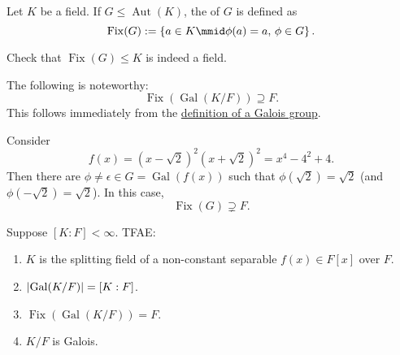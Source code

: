 \documentclass[notoc,notitlepage,nobib]{tufte-book}
\DeclareMathOperator{\Aut}{Aut}
\DeclareMathOperator{\Gal}{Gal}
\DeclareMathOperator{\Fix}{Fix}
\begin{document}
\begin{defn}\label{defn:fixed_field}
  Let $K$ be a field. If $G \leq \Aut(K)$, the  of $G$ is
  defined as
  \begin{equation*}
    \Fix(G) := \left\{ a \in K \mmid \phi(a) = a, \, \phi \in G \right\}.
  \end{equation*}
\end{defn}

\begin{ex}
  Check that $\Fix(G) \leq K$ is indeed a field.
\end{ex}

\begin{remark}
  The following is noteworthy:
  \begin{equation*}
    \Fix(\Gal(K / F)) \supseteq F.
  \end{equation*}
  This follows immediately from the \hyperref[defn:galois_group]{definition of a
  Galois group}.
\end{remark}

\begin{eg}
  Consider
  \begin{equation*}
    f(x) = (x - \sqrt{2})^2 (x + \sqrt{2})^2 = x^4 - 4^2 + 4.
  \end{equation*}
  Then there are $\phi \neq \epsilon \in G = \Gal(f(x))$ such that
  $\phi(\sqrt{2}) = \sqrt{2}$ (and $\phi(-\sqrt{2}) = \sqrt{2}$). In this case,
  \begin{equation*}
    \Fix(G) \supsetneq F.
  \end{equation*}
\end{eg}

\begin{thm}\label{thm:characterization_of_galois_extensions}
  Suppose $[ K : F ] < \infty$. TFAE:
  \begin{enumerate}
    \item $K$ is the splitting field of a non-constant separable $f(x) \in F[x]$
      over $F$.
    \item $\abs{\Gal(K / F)} = [ K : F ]$.
    \item $\Fix(\Gal(K / F)) = F$.
    \item $K / F$ is Galois.
  \end{enumerate}
\end{thm}
\end{document}

